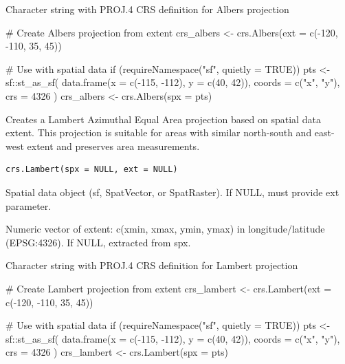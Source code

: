 \documentclass[a4paper]{book}
\begin{document}
%
\begin{Value}
Character string with PROJ.4 CRS definition for Albers projection
\end{Value}
%
\begin{Examples}
\begin{ExampleCode}
# Create Albers projection from extent
crs_albers <- crs.Albers(ext = c(-120, -110, 35, 45))

# Use with spatial data
if (requireNamespace("sf", quietly = TRUE)) {
  pts <- sf::st_as_sf(
    data.frame(x = c(-115, -112), y = c(40, 42)),
    coords = c("x", "y"),
    crs = 4326
  )
  crs_albers <- crs.Albers(spx = pts)
}
\end{ExampleCode}
\end{Examples}
%
\begin{Description}\relax
Creates a Lambert Azimuthal Equal Area projection based on spatial data
extent. This projection is suitable for areas with similar north-south and
east-west extent and preserves area measurements.
\end{Description}
%
\begin{Usage}
\begin{verbatim}
crs.Lambert(spx = NULL, ext = NULL)
\end{verbatim}
\end{Usage}
%
\begin{Arguments}
\begin{ldescription}
\item[\code{spx}] Spatial data object (sf, SpatVector, or SpatRaster). If NULL,
must provide ext parameter.

\item[\code{ext}] Numeric vector of extent: c(xmin, xmax, ymin, ymax) in
longitude/latitude (EPSG:4326). If NULL, extracted from spx.
\end{ldescription}
\end{Arguments}
%
\begin{Value}
Character string with PROJ.4 CRS definition for Lambert projection
\end{Value}
%
\begin{Examples}
\begin{ExampleCode}
# Create Lambert projection from extent
crs_lambert <- crs.Lambert(ext = c(-120, -110, 35, 45))

# Use with spatial data
if (requireNamespace("sf", quietly = TRUE)) {
  pts <- sf::st_as_sf(
    data.frame(x = c(-115, -112), y = c(40, 42)),
    coords = c("x", "y"),
    crs = 4326
  )
  crs_lambert <- crs.Lambert(spx = pts)
}
\end{ExampleCode}
\end{Examples}
\end{document}

